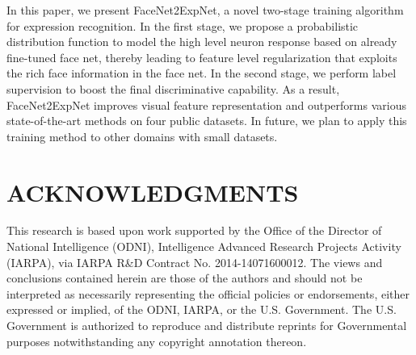 \documentclass[a4paper, 10pt, conference]{ieeeconf}      %
\begin{document}
In this paper, we present FaceNet2ExpNet, a novel two-stage training algorithm for expression recognition. 
In the first stage, we propose a probabilistic distribution function to model the high level neuron response based on already fine-tuned face net, thereby leading to feature level regularization that exploits the rich face information in the face net. In the second stage, we perform label supervision to boost the final discriminative capability. As a result, FaceNet2ExpNet improves visual feature representation and outperforms various state-of-the-art methods on four public datasets. In future, we plan to apply this training method to other domains with small datasets.






\section{ACKNOWLEDGMENTS}
This research is based upon work supported by the Office of the Director of National Intelligence (ODNI), Intelligence Advanced Research Projects Activity (IARPA), via IARPA R\&D Contract No. 2014-14071600012. The views and conclusions contained herein are those of the authors and should not be interpreted as necessarily representing the official policies or endorsements, either expressed
or implied, of the ODNI, IARPA, or the U.S. Government. The U.S. Government is authorized to reproduce and distribute
reprints for Governmental purposes notwithstanding any copyright annotation thereon.
%
\end{document}
